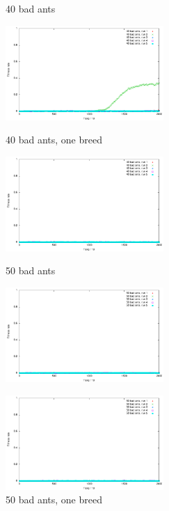 \documentclass[titlepage, a4paper, 12pt]{article}
\begin{document}
\begin{figure}

  \begin{minipage}[b]{0.5\linewidth}
    \centering
    \caption{40 bad ants }\label{fig:images/graph40}
    \includegraphics[width=6cm]{images/graph40.pdf}
  \end{minipage}
  \begin{minipage}[b]{0.5\linewidth}
    \centering
    \caption{40 bad ants, one breed }\label{fig:images/graph40oneBreed}
    \includegraphics[width=6cm]{images/graph40oneBreed.pdf}
  \end{minipage}
  
  \hspace{0.5cm}
  
  \begin{minipage}[b]{0.5\linewidth}
    \centering
    \caption{50 bad ants }\label{fig:images/graph50}
    \includegraphics[width=6cm]{images/graph50.pdf}
  \end{minipage}
  \begin{minipage}[b]{0.5\linewidth}
    \centering
    \caption{50 bad ants, one breed }\label{fig:images/graph50oneBreed}
    \includegraphics[width=6cm]{images/graph50oneBreed.pdf}
  \end{minipage}
\end{figure}
                    
\end{document}
